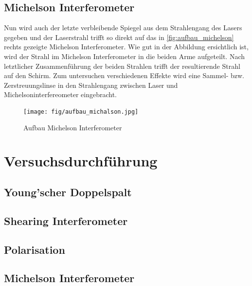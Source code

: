 \documentclass[ngerman]{scrartcl}
\begin{document}
\subsection{Michelson Interferometer}
\label{sec:aufbau_michelson}
Nun wird auch der letzte verbleibende Spiegel aus dem Strahlengang des Lasers gegeben und der Laserstrahl trifft so direkt auf das in \autoref{fig:aufbau_michelson} rechts gezeigte Michelson Interferometer. Wie gut in der Abbildung ersichtlich ist, wird der Strahl im Michelson Interferometer in die beiden Arme aufgeteilt. Nach letztlicher Zusammenführung der beiden Strahlen trifft der resultierende Strahl auf den Schirm. 
Zum untersuchen verschiedenen Effekte wird eine Sammel- bzw. Zerstreuungslinse in den Strahlengang zwischen Laser und Michelsoninterfereometer eingebracht. 
\begin{figure}[H]
    \centering
    \begin{samepage}
        \texttt{[image: fig/aufbau\_michalson.jpg]}
        \caption{Aufbau Michelson Interferometer}
        \label{fig:aufbau_michelson}
    \end{samepage}
\end{figure}


\section{Versuchsdurchführung}
\label{sec:durchfuehrung}

\subsection{Young'scher Doppelspalt}
\label{sec:durchfuehrung_doppelspalt}

\subsection{Shearing Interferometer}
\label{sec:durchfuehrung_shearing}

\subsection{Polarisation}
\label{sec:durchfuehrung_polarisation}

\subsection{Michelson Interferometer}
\label{sec:durchfuehrung_michelson}

\end{document}
